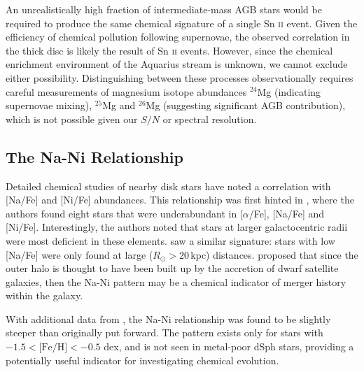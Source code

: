 \documentclass{emulateapj}
\begin{document}
An unrealistically high fraction of intermediate-mass AGB stars would be required to produce the same chemical signature of a single Sn \textsc{ii} event. Given the efficiency of chemical pollution following supernovae, the observed correlation in the thick disc is likely the result of Sn \textsc{ii} events. However, since the chemical enrichment environment of the Aquarius stream is unknown, we cannot exclude either possibility. Distinguishing between these processes observationally requires careful measurements of magnesium isotope abundances $^{24}$Mg (indicating supernovae mixing), $^{25}$Mg and $^{26}$Mg (suggesting significant AGB contribution), which is not possible given our $S/N$ or spectral resolution.

\subsection{The Na-Ni Relationship}

Detailed chemical studies of nearby disk stars have noted a correlation with [Na/Fe] and [Ni/Fe] abundances. This relationship was first hinted in \citet{nissen;schuster_1997}, where the authors found eight stars that were underabundant in [$\alpha$/Fe], [Na/Fe] and [Ni/Fe]. Interestingly, the authors noted that stars at larger galactocentric radii were most deficient in these elements. \citet{fulbright_2000} saw a similar signature: stars with low [Na/Fe] were only found at large ($R_\odot > 20$\,kpc) distances. \citet{nissen;schuster_1997} proposed that since the outer halo is thought to have been built up by the accretion of dwarf satellite galaxies, then the Na-Ni pattern may be a chemical indicator of merger history within the galaxy.

With additional data from \citet{nissen;schuster_2011}, the Na-Ni relationship was found to be slightly steeper than originally put forward. The pattern exists only for stars with $-1.5 < \mbox{[Fe/H]} < -0.5$ dex, and is not seen in metal-poor dSph stars, providing a potentially useful indicator for investigating chemical evolution. 

\end{document}
